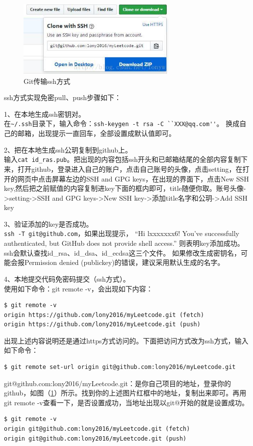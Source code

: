 \begin{figure}[h!]
\centering
\includegraphics[width=0.7\textwidth]{pictures/20170719225703754.jpeg}
\caption{Git传输ssh方式}
\label{fig:g239}
\end{figure}

ssh方式实现免密pull、push步骤如下：

1、在本地生成ssh密钥对。\\
在\verb|~/.ssh|目录下，输入命令：\verb|ssh-keygen -t rsa -C ``XXX@qq.com''|。
换成自己的邮箱，出现提示一直回车，全部设置成默认值即可。

2、把在本地生成ssh公玥复制到github上。\\
输入\verb|cat id_ras.pub|。把出现的内容包括ssh开头和已邮箱结尾的全部内容复制下来，打开github，登录进入自己的账户，点击自己账号的头像，点击setting，在打开的网页中点击屏幕左边的SSH and GPG keys，在出现的界面下，点击New SSH key,然后把之前赋值的内容复制进key下面的框内即可，title随便你取。账号头像->setting->SSH and GPG keys->New SSH key->添加title名字和公玥->Add SSH key

3、验证添加的key是否成功。\\
\verb|ssh -T git@github.com|，如果出现提示，
“Hi lxxxxxxx6! You’ve successfully authenticated, but GitHub does not provide shell access.”
则表明key添加成功。
ssh会默认查找id\_rsa、id\_dsa、id\_ecdsa这三个文件。
如果修改生成密钥名，可能会报Permission denied (publickey)的错误，建议采用默认生成的名字。

4、本地提交代码免密码提交（ssh方式）。\\
使用如下命令：git remote -v，会出现如下内容：
\begin{verbatim}
$ git remote -v
origin https://github.com/lony2016/myLeetcode.git (fetch)
origin https://github.com/lony2016/myLeetcode.git (push)
\end{verbatim}
出现上述内容说明还是通过https方式访问的。下面把访问方式改为ssh方式，输入如下命令：
\begin{verbatim}
$ git remote set-url origin git@github.com:lony2016/myLeetcode.git
\end{verbatim}
git@github.com:lony2016/myLeetcode.git：是你自己项目的地址，登录你的github，如图（\ref{fig:g239}）所示。找到你的上述图片红框中的地址，复制出来即可。再用git remote -v查看一下，是否设置成功，当地址出现以git@开始的就是设置成功。
\begin{verbatim}
$ git remote -v
origin git@github.com:lony2016/myLeetcode.git (fetch)
origin git@github.com:lony2016/myLeetcode.git (push)
\end{verbatim}





